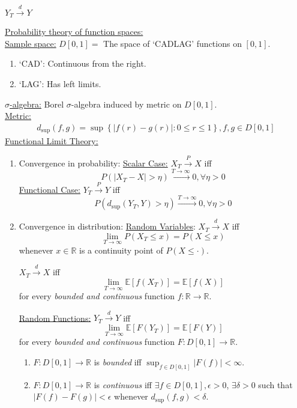 \documentclass[11pt]{elegantbook}
\begin{document}
\begin{claim}
    $Y_T \stackrel{d}{\longrightarrow} Y$
\end{claim}
\underline{Probability theory of function spaces:}\\
\underline{Sample space:} $D[0,1]=$ The space of `CADLAG' functions on $[0,1]$.
\begin{enumerate}[$\cdot$]
    \item `CAD': Continuous from the right.
    \item `LAG': Has left limits.
\end{enumerate}
\underline{$\sigma$-algebra:} Borel $\sigma$-algebra induced by metric on $D[0,1]$.\\
\underline{Metric:}
\begin{equation}
    \begin{aligned}
        d_{\sup}(f,g)=\sup\left\{|f(r)-g(r)|:0\leq r\leq 1\right\}, f,g\in D[0,1]
    \end{aligned}
    \nonumber
\end{equation}
\underline{Functional Limit Theory:}
\begin{enumerate}[$\cdot$]
    \item Convergence in probability:
    \subitem \underline{Scalar Case:} $X_T \stackrel{P}{\longrightarrow} X$ iff $$P(|X_T-X|>\eta) \stackrel{T \rightarrow \infty}{\longrightarrow} 0,\forall \eta>0$$
    \subitem \underline{Functional Case:} $Y_T \stackrel{P}{\longrightarrow} Y$ iff $$P(d_{\sup}(Y_T,Y)> \eta) \stackrel{T \rightarrow \infty}{\longrightarrow} 0,\forall \eta>0$$
    \item Convergence in distribution:
    \subitem \underline{Random Variables}: $X_T \stackrel{d}{\longrightarrow} X$ iff $$\lim_{T \rightarrow \infty}P(X_T\leq x)=P(X\leq x)$$
    whenever $x\in \mathbb{R}$ is a continuity point of $P(X\leq\cdot)$.
    \begin{theorem}
        $X_T \stackrel{d}{\longrightarrow} X$ iff $$\lim_{T \rightarrow \infty}\mathbb{E}[f(X_T)]=\mathbb{E}[f(X)]$$
        for every \textit{bounded and continuous} function $f: \mathbb{R} \rightarrow \mathbb{R}$.
    \end{theorem}
    \subitem \underline{Random Functions:} $Y_T \stackrel{d}{\longrightarrow} Y$ iff $$\lim_{T \rightarrow \infty}\mathbb{E}[F(Y_T)]=\mathbb{E}[F(Y)]$$
    for every \textit{bounded and continuous} function $F: D[0,1] \rightarrow \mathbb{R}$.

    \begin{remark}
        \begin{enumerate}
            \item $F:D[0,1] \rightarrow \mathbb{R}$ is \textit{bounded} iff $\sup_{f\in D[0,1]}|F(f)|<\infty$.
            \item $F:D[0,1] \rightarrow \mathbb{R}$ is \textit{continuous} iff $\exists f\in D[0,1],\epsilon>0$, $\exists \delta>0$ such that $|F(f)-F(g)|<\epsilon$ whenever $d_{\sup}(f,g)<\delta$.
        \end{enumerate}
    \end{remark}
\end{enumerate}
\end{document}
